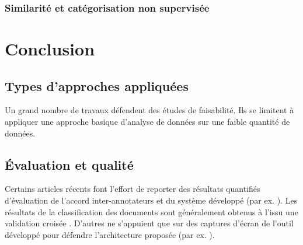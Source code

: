 \subsubsection{Similarité et catégorisation non supervisée}


\section{Conclusion}
\label{sec:literature:conclusion}
\subsection{Types d'approches appliquées}
Un grand nombre de travaux défendent des études de faisabilité. Ils se limitent à appliquer une approche basique d'analyse de données sur une faible quantité de données.


\subsection{Évaluation et qualité}
 Certains articles récents font l'effort de reporter des résultats quantifiés d'évaluation de l'accord inter-annotateurs et du système développé (par ex. \citep{Shulayeva2017recognfactprincip}). Les résultats de la classification des documents sont généralement obtenus à l'issu une validation croisée \cite{Sulea2017predictareadecision,sulea2017legalEnsSVM,Aletras2016predictDecisionECHR}. D'autres ne s'appuient que sur des captures d'écran de l'outil développé pour défendre l'architecture proposée (par ex. \citep{wyner2010extractlegalelts,Waltl2016lexia}).


